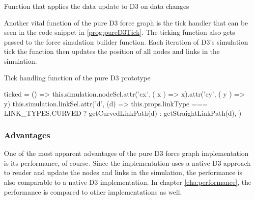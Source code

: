 \begin{program}[H]
\caption{Function that applies the data update to D3 on data changes}
\label{prog:pureD3updateApply}
\end{program}

Another vital function of the pure D3 force graph is the tick handler that can be seen in the code snippet in \ref{prog:pureD3Tick}. The ticking function also gets passed to the force simulation builder function. Each iteration of D3's simulation tick the function then updates the position of all nodes and links in the simulation.

\begin{program}[H]
\caption{Tick handling function of the pure D3 prototype}
\label{prog:pureD3Tick}
\begin{JsCode}
ticked = () => {
  this.simulation.nodeSel.attr('cx', ({ x }) => x).attr('cy', ({ y }) => y)
  this.simulation.linkSel.attr('d', (d) =>
    this.props.linkType === LINK_TYPES.CURVED ? getCurvedLinkPath(d) : getStraightLinkPath(d),
  )
}
\end{JsCode}
\end{program}

\subsubsection{Advantages}

One of the most apparent advantages of the pure D3 force graph implementation is its performance, of course. Since the implementation uses a native D3 approach to render and update the nodes and links in the simulation, the performance is also comparable to a native D3 implementation. In chapter \ref{cha:performance}, the performance is compared to other implementations as well.

